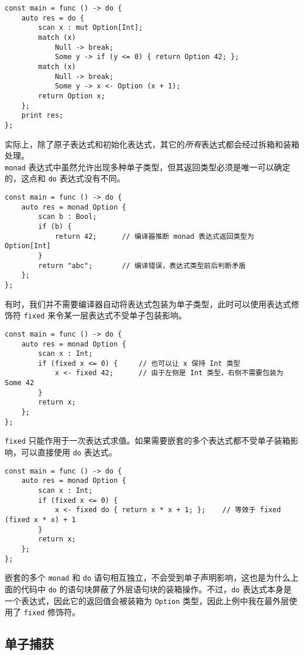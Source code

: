 \begin{lstlisting}
const main = func () -> do {
	auto res = do {
		scan x : mut Option[Int];
		match (x)
			Null -> break;
			Some y -> if (y <= 0) { return Option 42; };
		match (x)
			Null -> break;
			Some y -> x <- Option (x + 1);
		return Option x;
	};
	print res;
};
\end{lstlisting}

实际上，除了原子表达式和初始化表达式，其它的\emph{所有}表达式都会经过拆箱和装箱处理。 \\

\lstinline!monad! 表达式中虽然允许出现多种单子类型，但其返回类型必须是唯一可以确定的，这点和 \lstinline!do! 表达式没有不同。

\begin{lstlisting}
const main = func () -> do {
	auto res = monad Option {
		scan b : Bool;
		if (b) {
			return 42;		// 编译器推断 monad 表达式返回类型为 Option[Int]
		}
		return "abc";		// 编译错误，表达式类型前后判断矛盾
	};
};
\end{lstlisting}

有时，我们并不需要编译器自动将表达式包装为单子类型，此时可以使用表达式修饰符 \lstinline!fixed! 来令某一层表达式不受单子包装影响。

\begin{lstlisting}
const main = func () -> do {
	auto res = monad Option {
		scan x : Int;
		if (fixed x <= 0) {		// 也可以让 x 保持 Int 类型
			x <- fixed 42;		// 由于左侧是 Int 类型，右侧不需要包装为 Some 42
		}
		return x;
	};
};
\end{lstlisting}

\lstinline!fixed! 只能作用于一次表达式求值。如果需要嵌套的多个表达式都不受单子装箱影响，可以直接使用 \lstinline!do! 表达式。

\begin{lstlisting}
const main = func () -> do {
	auto res = monad Option {
		scan x : Int;
		if (fixed x <= 0) {
			x <- fixed do { return x * x + 1; };	// 等效于 fixed (fixed x * x) + 1
		}
		return x;
	};
};
\end{lstlisting}

嵌套的多个 \lstinline!monad! 和 \lstinline!do! 语句相互独立，不会受到单子声明影响，这也是为什么上面的代码中 \lstinline!do! 的语句块屏蔽了外层语句块的装箱操作。不过，\lstinline!do! 表达式本身是一个表达式，因此它的返回值会被装箱为 \lstinline!Option! 类型，因此上例中我在最外层使用了 \lstinline!fixed! 修饰符。

\subsection{单子捕获}

